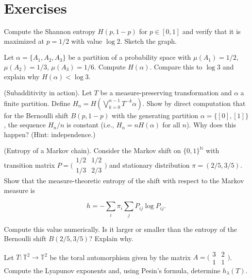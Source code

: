 \section*{Exercises}

\begin{exercise}
Compute the Shannon entropy $H(p, 1-p)$ for $p \in [0,1]$ and verify that it is maximized at $p = 1/2$ with value $\log 2$. Sketch the graph.
\end{exercise}


\begin{exercise}
Let $\alpha = \{A_1, A_2, A_3\}$ be a partition of a probability space with $\mu(A_1) = 1/2$, $\mu(A_2) = 1/3$, $\mu(A_3) = 1/6$. Compute $H(\alpha)$. Compare this to $\log 3$ and explain why $H(\alpha) < \log 3$.
\end{exercise}


\begin{exercise}
(Subadditivity in action). Let $T$ be a measure-preserving transformation and $\alpha$ a finite partition. Define $H_n = H\!\left(\bigvee_{k=0}^{n-1}T^{-k}\alpha\right)$. Show by direct computation that for the Bernoulli shift $B(p, 1-p)$ with the generating partition $\alpha = \{[0], [1]\}$, the sequence $H_n/n$ is constant (i.e., $H_n = nH(\alpha)$ for all $n$). Why does this happen? (Hint: independence.)
\end{exercise}


\begin{exercise}
(Entropy of a Markov chain). Consider the Markov shift on $\{0, 1\}^{\mathbb{N}}$ with transition matrix $P = \bigl(\begin{smallmatrix} 1/2 & 1/2 \\ 1/3 & 2/3 \end{smallmatrix}\bigr)$ and stationary distribution $\pi = (2/5, 3/5)$. Show that the measure-theoretic entropy of the shift with respect to the Markov measure is

\[
h = -\sum_i \pi_i \sum_j P_{ij} \log P_{ij}.
\]

Compute this value numerically. Is it larger or smaller than the entropy of the Bernoulli shift $B(2/5, 3/5)$? Explain why.
\end{exercise}


\begin{exercise}
Let $T \colon \mathbb{T}^2 \to \mathbb{T}^2$ be the toral automorphism given by the matrix $A = \bigl(\begin{smallmatrix} 3 & 2 \\ 1 & 1\end{smallmatrix}\bigr)$. Compute the Lyapunov exponents and, using Pesin's formula, determine $h_\lambda(T)$.
\end{exercise}


